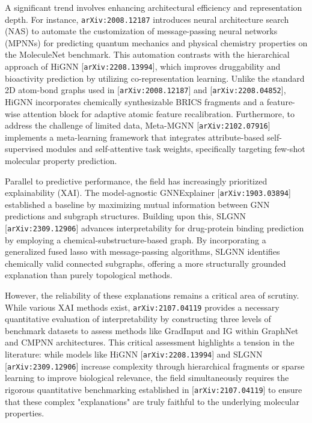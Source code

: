 \documentclass[11pt]{article}
\begin{document}
A significant trend involves enhancing architectural efficiency and representation depth. For instance, \texttt{arXiv:2008.12187} introduces neural architecture search (NAS) to automate the customization of message-passing neural networks (MPNNs) for predicting quantum mechanics and physical chemistry properties on the MoleculeNet benchmark. This automation contrasts with the hierarchical approach of HiGNN [\texttt{arXiv:2208.13994}], which improves druggability and bioactivity prediction by utilizing co-representation learning. Unlike the standard 2D atom-bond graphs used in [\texttt{arXiv:2008.12187}] and [\texttt{arXiv:2208.04852}], HiGNN incorporates chemically synthesizable BRICS fragments and a feature-wise attention block for adaptive atomic feature recalibration. Furthermore, to address the challenge of limited data, Meta-MGNN [\texttt{arXiv:2102.07916}] implements a meta-learning framework that integrates attribute-based self-supervised modules and self-attentive task weights, specifically targeting few-shot molecular property prediction.

Parallel to predictive performance, the field has increasingly prioritized explainability (XAI). The model-agnostic GNNExplainer [\texttt{arXiv:1903.03894}] established a baseline by maximizing mutual information between GNN predictions and subgraph structures. Building upon this, SLGNN [\texttt{arXiv:2309.12906}] advances interpretability for drug-protein binding prediction by employing a chemical-substructure-based graph. By incorporating a generalized fused lasso with message-passing algorithms, SLGNN identifies chemically valid connected subgraphs, offering a more structurally grounded explanation than purely topological methods.

However, the reliability of these explanations remains a critical area of scrutiny. While various XAI methods exist, \texttt{arXiv:2107.04119} provides a necessary quantitative evaluation of interpretability by constructing three levels of benchmark datasets to assess methods like GradInput and IG within GraphNet and CMPNN architectures. This critical assessment highlights a tension in the literature: while models like HiGNN [\texttt{arXiv:2208.13994}] and SLGNN [\texttt{arXiv:2309.12906}] increase complexity through hierarchical fragments or sparse learning to improve biological relevance, the field simultaneously requires the rigorous quantitative benchmarking established in [\texttt{arXiv:2107.04119}] to ensure that these complex "explanations" are truly faithful to the underlying molecular properties.
\end{document}
